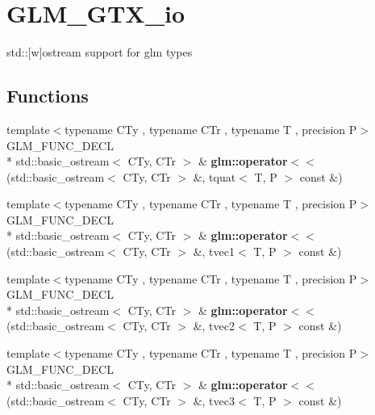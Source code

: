 \hypertarget{group__gtx__io}{\section{G\-L\-M\-\_\-\-G\-T\-X\-\_\-io}
\label{group__gtx__io}
}


std\-:\-:\mbox{[}w\mbox{]}ostream support for glm types  


\subsection*{Functions}
\begin{DoxyCompactItemize}
\item 
\hypertarget{group__gtx__io_ga038d37e8d7965dc7bfae5dc23e4140af}{{\footnotesize template$<$typename C\-Ty , typename C\-Tr , typename T , precision P$>$ }\\G\-L\-M\-\_\-\-F\-U\-N\-C\-\_\-\-D\-E\-C\-L \\*
std\-::basic\-\_\-ostream$<$ C\-Ty, C\-Tr $>$ \& {\bfseries glm\-::operator$<$$<$} (std\-::basic\-\_\-ostream$<$ C\-Ty, C\-Tr $>$ \&, tquat$<$ T, P $>$ const \&)}\label{group__gtx__io_ga038d37e8d7965dc7bfae5dc23e4140af}

\item 
\hypertarget{group__gtx__io_ga171289d1671b75e033a1b078c68a7460}{{\footnotesize template$<$typename C\-Ty , typename C\-Tr , typename T , precision P$>$ }\\G\-L\-M\-\_\-\-F\-U\-N\-C\-\_\-\-D\-E\-C\-L \\*
std\-::basic\-\_\-ostream$<$ C\-Ty, C\-Tr $>$ \& {\bfseries glm\-::operator$<$$<$} (std\-::basic\-\_\-ostream$<$ C\-Ty, C\-Tr $>$ \&, tvec1$<$ T, P $>$ const \&)}\label{group__gtx__io_ga171289d1671b75e033a1b078c68a7460}

\item 
\hypertarget{group__gtx__io_ga0a3bca262adbba991f394d8d3d52e10d}{{\footnotesize template$<$typename C\-Ty , typename C\-Tr , typename T , precision P$>$ }\\G\-L\-M\-\_\-\-F\-U\-N\-C\-\_\-\-D\-E\-C\-L \\*
std\-::basic\-\_\-ostream$<$ C\-Ty, C\-Tr $>$ \& {\bfseries glm\-::operator$<$$<$} (std\-::basic\-\_\-ostream$<$ C\-Ty, C\-Tr $>$ \&, tvec2$<$ T, P $>$ const \&)}\label{group__gtx__io_ga0a3bca262adbba991f394d8d3d52e10d}

\item 
\hypertarget{group__gtx__io_ga0d6cfb5d138639b90f18d7bbb2a4ae56}{{\footnotesize template$<$typename C\-Ty , typename C\-Tr , typename T , precision P$>$ }\\G\-L\-M\-\_\-\-F\-U\-N\-C\-\_\-\-D\-E\-C\-L \\*
std\-::basic\-\_\-ostream$<$ C\-Ty, C\-Tr $>$ \& {\bfseries glm\-::operator$<$$<$} (std\-::basic\-\_\-ostream$<$ C\-Ty, C\-Tr $>$ \&, tvec3$<$ T, P $>$ const \&)}\label{group__gtx__io_ga0d6cfb5d138639b90f18d7bbb2a4ae56}


\end{DoxyCompactItemize}
